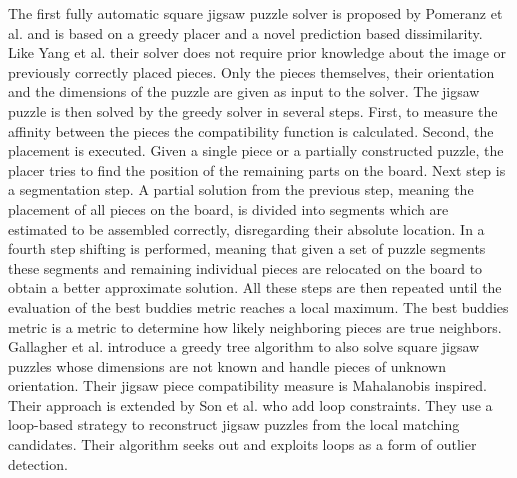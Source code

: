 \documentclass[11pt]{report}
\begin{document}
The first fully automatic square jigsaw puzzle solver is proposed by Pomeranz et
al. \cite{Pomeranz2011} and is based on a greedy placer and a novel prediction
based dissimilarity. Like Yang et al. \cite{yang2011particle} their solver does
not require prior knowledge about the image or previously correctly placed
pieces. Only the pieces themselves, their orientation and the dimensions of the
puzzle are given as input to the solver. The jigsaw puzzle is then solved by the
greedy solver in several steps. First, to measure the affinity between the
pieces the compatibility function is calculated. Second, the placement is
executed. Given a single piece or a partially constructed puzzle, the placer
tries to find the position of the remaining parts on the board. Next step is a
segmentation step. A partial solution from the previous step, meaning the
placement of all pieces on the board, is divided into segments which are
estimated to be assembled correctly, disregarding their absolute location. In a
fourth step shifting is performed, meaning that given a set of puzzle segments
these segments and remaining individual pieces are relocated on the board to
obtain a better approximate solution. All these steps are then repeated until the
evaluation of the best buddies metric reaches a local maximum. The best buddies
metric is a metric to determine how likely neighboring pieces are true
neighbors. Gallagher et al. \cite{gallagher2012jigsaw} introduce a greedy tree
algorithm to also solve square jigsaw puzzles whose dimensions are not known and handle pieces
of unknown orientation. Their jigsaw piece compatibility measure is
Mahalanobis inspired. Their approach is extended by Son et al.
\cite{son2014solving} who add loop constraints. They use a loop-based strategy
to reconstruct jigsaw puzzles from the local matching candidates. Their
algorithm seeks out and exploits loops as a form of outlier detection.
\end{document}
